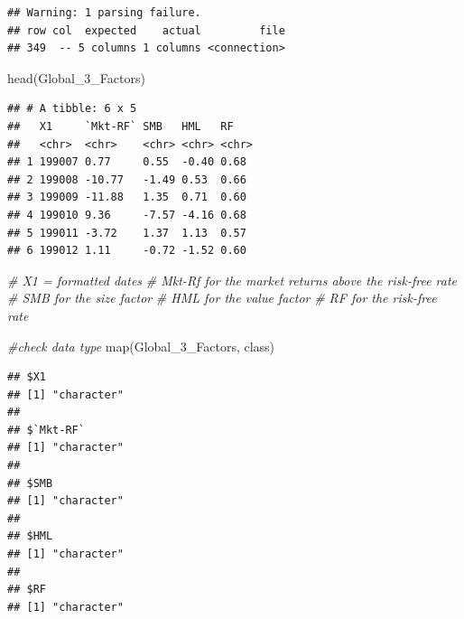 \documentclass[
]{book}
\newenvironment{Shaded}{\begin{snugshade}}{\end{snugshade}}
\newcommand{\CommentTok}[1]{\textcolor[rgb]{0.56,0.35,0.01}{\textit{#1}}}
\newcommand{\FunctionTok}[1]{\textcolor[rgb]{0.00,0.00,0.00}{#1}}
\newcommand{\NormalTok}[1]{#1}
\begin{document}
\begin{verbatim}
## Warning: 1 parsing failure.
## row col  expected    actual         file
## 349  -- 5 columns 1 columns <connection>
\end{verbatim}

\begin{Shaded}
\begin{Highlighting}[]
\FunctionTok{head}\NormalTok{(Global\_3\_Factors)}
\end{Highlighting}
\end{Shaded}

\begin{verbatim}
## # A tibble: 6 x 5
##   X1     `Mkt-RF` SMB   HML   RF   
##   <chr>  <chr>    <chr> <chr> <chr>
## 1 199007 0.77     0.55  -0.40 0.68 
## 2 199008 -10.77   -1.49 0.53  0.66 
## 3 199009 -11.88   1.35  0.71  0.60 
## 4 199010 9.36     -7.57 -4.16 0.68 
## 5 199011 -3.72    1.37  1.13  0.57 
## 6 199012 1.11     -0.72 -1.52 0.60
\end{verbatim}

\begin{Shaded}
\begin{Highlighting}[]
\CommentTok{\# X1 = formatted dates}
\CommentTok{\# Mkt{-}Rf for the market returns above the risk{-}free rate}
\CommentTok{\# SMB for the size factor}
\CommentTok{\# HML for the value factor}
\CommentTok{\# RF for the risk{-}free rate}

\CommentTok{\#check data type}
\FunctionTok{map}\NormalTok{(Global\_3\_Factors, class)}
\end{Highlighting}
\end{Shaded}

\begin{verbatim}
## $X1
## [1] "character"
## 
## $`Mkt-RF`
## [1] "character"
## 
## $SMB
## [1] "character"
## 
## $HML
## [1] "character"
## 
## $RF
## [1] "character"
\end{verbatim}
\end{document}
